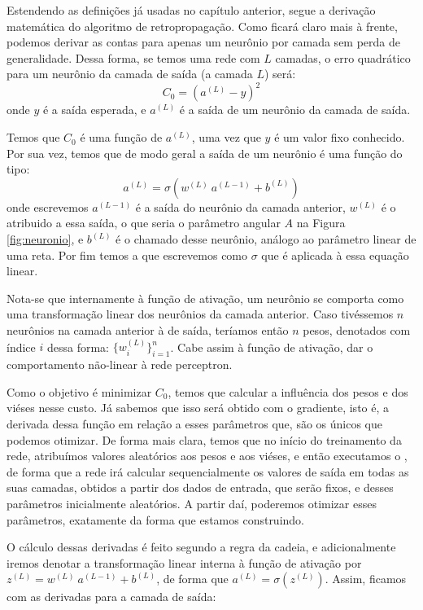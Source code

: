 Estendendo as definições já usadas no capítulo anterior, segue a derivação matemática do algoritmo de retropropagação. Como ficará claro mais à frente, podemos derivar as contas para apenas um neurônio por camada sem perda de generalidade. Dessa forma, se temos uma rede com $L$ camadas, o erro quadrático para um neurônio da camada de saída (a camada $L$) será:
\[
C_0 = (a^{(L)} - y)^2
\]
onde $y$ é a saída esperada, e $a^{(L)}$ é a saída de um neurônio da camada de saída.

Temos que $C_0$ é uma função de $a^{(L)}$, uma vez que $y$ é um valor fixo conhecido. Por sua vez, temos que de modo geral a saída de um neurônio é uma função do tipo:
\[
a^{(L)} = \sigma(w^{(L)}~a^{(L-1)} + b^{(L)})
\]
onde escrevemos $a^{(L-1)}$ é a saída do neurônio da camada anterior, $w^{(L)}$ é o  atribuido a essa saída, o que seria o parâmetro angular $A$ na Figura \ref{fig:neuronio}, e $b^{(L)}$ é o chamado  desse neurônio, análogo ao parâmetro linear de uma reta. Por fim temos a  que escrevemos como $\sigma$ que é aplicada à essa equação linear.

Nota-se que internamente à função de ativação, um neurônio se comporta como uma transformação linear dos neurônios da camada anterior. Caso tivéssemos $n$ neurônios na camada anterior à de saída, teríamos então $n$ pesos, denotados com índice $i$ dessa forma: $\{ w_i^{(L)} \}_{i=1}^n$. Cabe assim à função de ativação, dar o comportamento não-linear à rede perceptron.

Como o objetivo é minimizar $C_0$, temos que calcular a influência dos pesos e dos viéses nesse custo. Já sabemos que isso será obtido com o gradiente, isto é, a derivada dessa função em relação a esses parâmetros que, são os únicos que podemos otimizar. De forma mais clara, temos que no início do treinamento da rede, atribuímos valores aleatórios aos pesos e aos viéses, e então executamos o , de forma que a rede irá calcular sequencialmente os valores de saída em todas as suas camadas, obtidos a partir dos dados de entrada, que serão fixos, e desses parâmetros inicialmente aleatórios. A partir daí, poderemos otimizar esses parâmetros, exatamente da forma que estamos construindo.

O cálculo dessas derivadas é feito segundo a regra da cadeia, e adicionalmente iremos denotar a transformação linear interna à função de ativação por $z^{(L)} = w^{(L)}~a^{(L-1)} + b^{(L)}$, de forma que $a^{(L)} = \sigma(z^{(L)})$. Assim, ficamos com as derivadas para a camada de saída:

